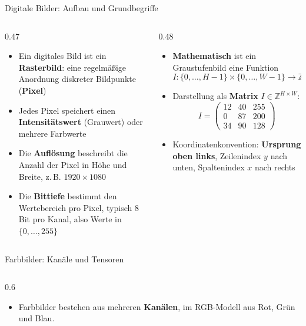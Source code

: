 {
\begin{frame}{Digitale Bilder: Aufbau und Grundbegriffe}
  \small
\begin{columns}
\begin{column}{0.47\textwidth}
\begin{itemize}
    \item Ein digitales Bild ist ein \textbf{Rasterbild}: eine regelmäßige Anordnung diskreter Bildpunkte (\textbf{Pixel})
    \item Jedes Pixel speichert einen \textbf{Intensitätswert} (Grauwert) oder mehrere Farbwerte
    \item Die \textbf{Auflösung} beschreibt die Anzahl der Pixel in Höhe und Breite, z.\,B. $1920 \times 1080$
    \item Die \textbf{Bittiefe} bestimmt den Wertebereich pro Pixel, typisch 8 Bit pro Kanal, also Werte in $\{0, \dots, 255\}$
\end{itemize}
\end{column}
\begin{column}{0.48\textwidth}
\begin{itemize}
    \item \textbf{Mathematisch} ist ein Graustufenbild eine Funktion
    \[
        I : \{0, \dots, H-1\} \times \{0, \dots, W-1\} \to \mathbb{Z}
    \]
    \item Darstellung als \textbf{Matrix} $I \in \mathbb{Z}^{H \times W}$:
    \[
    I = \begin{pmatrix}
        12 & 40 & 255 \\
        0  & 87 & 200 \\
        34 & 90 & 128
    \end{pmatrix}
    \]
    \item Koordinatenkonvention: \textbf{Ursprung oben links}, Zeilenindex $y$ nach unten, Spaltenindex $x$ nach rechts
\end{itemize}
\end{column}
\end{columns}
\end{frame}

\begin{frame}{Farbbilder: Kanäle und Tensoren}

\begin{columns}

\begin{column}{0.6\textwidth}
\begin{itemize}
    \item Farbbilder bestehen aus mehreren \textbf{Kanälen}, im RGB-Modell aus Rot, Grün und Blau.
    

\end{itemize}
\end{column}
\end{columns}
\end{frame}}
